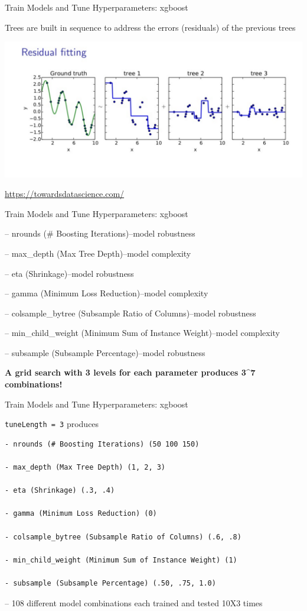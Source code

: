 \documentclass[ignorenonframetext,]{beamer}
\begin{document}
\begin{frame}{Train Models and Tune Hyperparameters: xgboost}

Trees are built in sequence to address the errors (residuals) of the
previous trees

\includegraphics[width=0.9\linewidth]{xgboost_residualfitting}

{\url{https://towardsdatascience.com/}}

\end{frame}

\begin{frame}{Train Models and Tune Hyperparameters: xgboost}

-- nrounds (\# Boosting Iterations)--model robustness

-- max\_depth (Max Tree Depth)--model complexity

-- eta (Shrinkage)--model robustness

-- gamma (Minimum Loss Reduction)--model complexity

-- colsample\_bytree (Subsample Ratio of Columns)--model robustness

-- min\_child\_weight (Minimum Sum of Instance Weight)--model complexity

-- subsample (Subsample Percentage)--model robustness

\textbf{A grid search with 3 levels for each parameter produces 3\^{}7
combinations!}

\end{frame}

\begin{frame}[fragile]{Train Models and Tune Hyperparameters: xgboost}

\texttt{tuneLength\ =\ 3} produces

\begin{verbatim}
- nrounds (# Boosting Iterations) (50 100 150)

- max_depth (Max Tree Depth) (1, 2, 3)

- eta (Shrinkage) (.3, .4)

- gamma (Minimum Loss Reduction) (0)

- colsample_bytree (Subsample Ratio of Columns) (.6, .8)

- min_child_weight (Minimum Sum of Instance Weight) (1)

- subsample (Subsample Percentage) (.50, .75, 1.0)
\end{verbatim}

-- 108 different model combinations each trained and tested 10X3 times

\end{frame}
\end{document}
